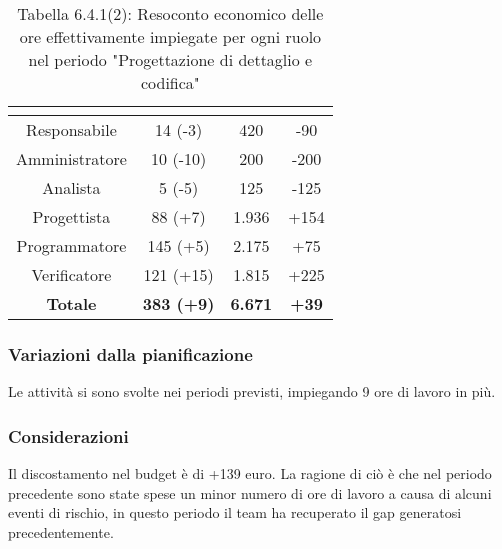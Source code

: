 \renewcommand{\arraystretch}{1.4}
\begin{table}[H]
\begin{center}
\begin{tabular}{|c|c|c|c|}
\hline
\rowcolor{title_row}
\textbf{\color{title_text}{Ruolo}}  & \textbf{\color{title_text}{Ore}} & \textbf{\color{title_text}{Costo in \euro}} & \textbf{\color{title_text}{Differenza al preventivo in \euro}} \\ \hline
Responsabile    & 14 (-3) & 420 & -90\\  \hline
Amministratore  & 10 (-10)& 200 & -200 \\ \hline
Analista        & 5 (-5) & 125 & -125 \\ \hline
Progettista     & 88 (+7) & 1.936 & +154\\ \hline
Programmatore   & 145 (+5) & 2.175 & +75\\ \hline
Verificatore    & 121 (+15) & 1.815& +225\\ \hline
\textbf{Totale} & \textbf{383 (+9)}    & \textbf{6.671} & \textbf{+39} \\ \hline
\end{tabular}
\caption{Tabella 6.4.1(2): Resoconto economico delle ore effettivamente impiegate per ogni ruolo nel periodo "Progettazione di dettaglio e codifica"\label{}}
\end{center}
\end{table}
\renewcommand{\arraystretch}{1}


\subsubsection{Variazioni dalla pianificazione}
Le attività si sono svolte nei periodi previsti, impiegando 9 ore di lavoro in più.

\subsubsection{Considerazioni}
Il discostamento nel budget è di +139 euro. La ragione di ciò è che nel periodo precedente sono state spese un minor numero di ore di lavoro a causa di alcuni eventi di rischio, in questo periodo il team ha recuperato il gap generatosi precedentemente. 

\pagebreak
